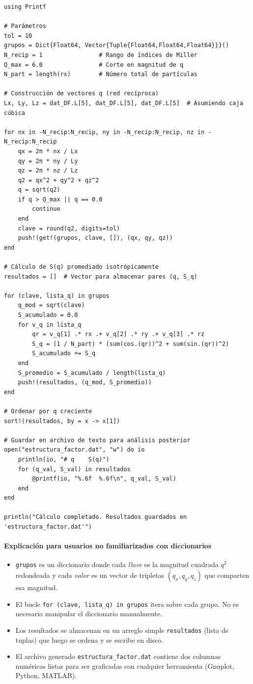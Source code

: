 \documentclass{tufte-handout}
\begin{document}
\begin{verbatim}
using Printf

# Parámetros
tol = 10
grupos = Dict{Float64, Vector{Tuple{Float64,Float64,Float64}}}()
N_recip = 1                # Rango de índices de Miller
Q_max = 6.0                # Corte en magnitud de q
N_part = length(rx)        # Número total de partículas

# Construcción de vectores q (red recíproca)
Lx, Ly, Lz = dat_DF.L[5], dat_DF.L[5], dat_DF.L[5]  # Asumiendo caja cúbica

for nx in -N_recip:N_recip, ny in -N_recip:N_recip, nz in -N_recip:N_recip
    qx = 2π * nx / Lx
    qy = 2π * ny / Ly
    qz = 2π * nz / Lz
    q2 = qx^2 + qy^2 + qz^2
    q = sqrt(q2)
    if q > Q_max || q == 0.0
        continue
    end
    clave = round(q2, digits=tol)
    push!(get!(grupos, clave, []), (qx, qy, qz))
end

# Cálculo de S(q) promediado isotrópicamente
resultados = []  # Vector para almacenar pares (q, S_q)

for (clave, lista_q) in grupos
    q_mod = sqrt(clave)
    S_acumulado = 0.0
    for v_q in lista_q
        qr = v_q[1] .* rx .+ v_q[2] .* ry .+ v_q[3] .* rz
        S_q = (1 / N_part) * (sum(cos.(qr))^2 + sum(sin.(qr))^2)
        S_acumulado += S_q
    end
    S_promedio = S_acumulado / length(lista_q)
    push!(resultados, (q_mod, S_promedio))
end

# Ordenar por q creciente
sort!(resultados, by = x -> x[1])

# Guardar en archivo de texto para análisis posterior
open("estructura_factor.dat", "w") do io
    println(io, "# q    S(q)")
    for (q_val, S_val) in resultados
        @printf(io, "%.6f  %.6f\n", q_val, S_val)
    end
end

println("Cálculo completado. Resultados guardados en 'estructura_factor.dat'")
\end{verbatim}

\paragraph*{Explicación para usuarios no familiarizados con diccionarios}

\begin{itemize}
    \item \texttt{grupos} es un diccionario donde cada \textit{llave} es la magnitud cuadrada $q^2$ redondeada y cada \textit{valor} es un vector de tripletas $(q_x,q_y,q_z)$ que comparten esa magnitud.
    \item El bucle \texttt{for (clave, lista\_q) in grupos} itera sobre cada grupo. No es necesario manipular el diccionario manualmente.
    \item Los resultados se almacenan en un arreglo simple \texttt{resultados} (lista de tuplas) que luego se ordena y se escribe en disco.
    \item El archivo generado \texttt{estructura\_factor.dat} contiene dos columnas numéricas listas para ser graficadas con cualquier herramienta (Gnuplot, Python, MATLAB).
\end{itemize}
\end{document}
